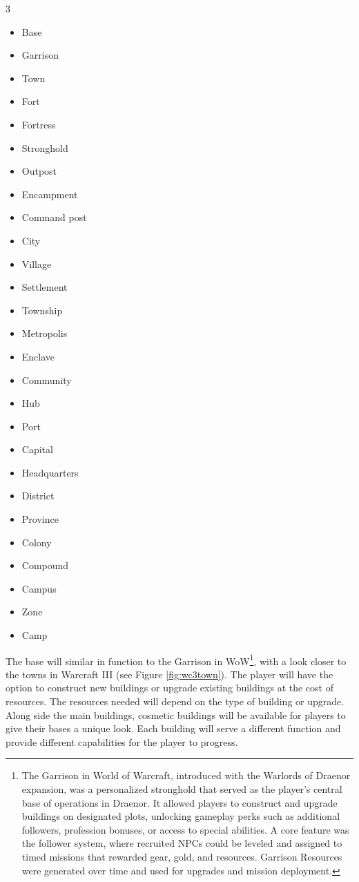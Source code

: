 \begin{multicols}{3}
	\begin{itemize}[noitemsep, topsep=0pt]
		\item Base
		\item Garrison
		\item Town
		\item Fort
		\item Fortress
		\item Stronghold
		\item Outpost
		\item Encampment
		\item Command post
		\item City
		\item Village
		\item Settlement
		\item Township
		\item Metropolis
		\item Enclave
		\item Community
		\item Hub
		\item Port
		\item Capital
		\item Headquarters
		\item District
		\item Province
		\item Colony
		\item Compound
		\item Campus
		\item Zone
		\item Camp
	\end{itemize}
\end{multicols}

The base will similar in function to the Garrison in WoW\footnote{The Garrison in World of Warcraft, introduced with the Warlords of Draenor expansion, was a personalized stronghold that served as the player’s central base of operations in Draenor. It allowed players to construct and upgrade buildings on designated plots, unlocking gameplay perks such as additional followers, profession bonuses, or access to special abilities. A core feature was the follower system, where recruited NPCs could be leveled and assigned to timed missions that rewarded gear, gold, and resources. Garrison Resources were generated over time and used for upgrades and mission deployment.}, with a look closer to the towns in Warcraft III (see Figure \ref{fig:wc3town}). The player will have the option to construct new buildings or upgrade existing buildings at the cost of resources. The resources needed will depend on the type of building or upgrade. Along side the main buildings, cosmetic buildings will be available for players to give their bases a unique look. Each building will serve a different function and provide different capabilities for the player to progress. 

